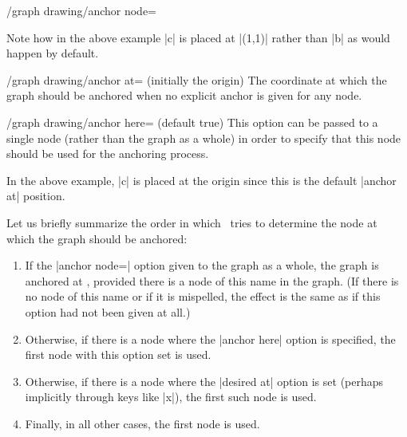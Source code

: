 {\begin{key}{/graph drawing/anchor node=}
\begin{codeexample}[]
\end{codeexample}
  Note how in the above example |c| is placed at |(1,1)| rather than
  |b| as would happen by default.
\end{key}

\begin{key}{/graph drawing/anchor at= (initially the origin)}
  The coordinate at which the graph should be anchored when no
  explicit anchor is given for any node.
\begin{codeexample}[]
\end{codeexample}
\end{key}

\begin{key}{/graph drawing/anchor here= (default true)}
  This option can be passed to a single node (rather than the graph as
  a whole) in order to specify that this node should be used for the
  anchoring process.
\begin{codeexample}[]
\end{codeexample}
  In the above example, |c| is placed at the origin since this is the
  default |anchor at| position.
\end{key}

Let us briefly summarize the order in which \tikzname\ tries to
determine the node at which the graph should be anchored:
\begin{enumerate}
\item If the |anchor node=| option given to the graph
  as a whole, the graph is anchored at , provided
  there is a node of this name in the graph. (If there is no node of
  this name or if it is mispelled, the effect is the same as if this
  option had not been given at all.)
\item Otherwise, if there is a node where the |anchor here| option is
  specified, the first node with this option set is used.
\item Otherwise, if there is a node where the |desired at| option is
  set (perhaps implicitly through keys like |x|), the first such node
  is used.
\item Finally, in all other cases, the first node is used.
\end{enumerate}

}
